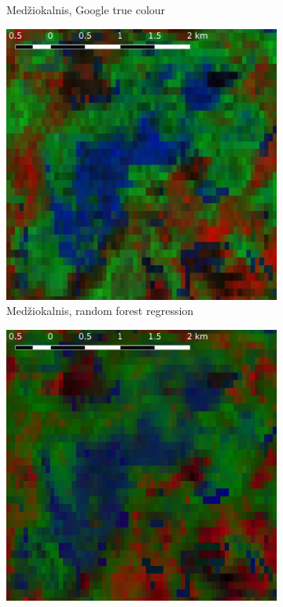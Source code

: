 \documentclass[a4paper,12pt]{scrbook}
\begin{document}
\begin{figure}
\begin{subfigure}[t]{.24\textwidth}
    \caption{Med\v{z}iokalnis, Google true colour}
  \end{subfigure} \hfill
  \begin{subfigure}[t]{.24\textwidth}
    \includegraphics[width=\textwidth]{thesis-figures/figures-qgis/medziokalnis-rf}
    \caption{Med\v{z}iokalnis, random forest regression}
    \label{subfig-medziokalnis-rf}
  \end{subfigure} \hfill
  \begin{subfigure}[t]{.24\textwidth}
    \includegraphics[width=\textwidth]{thesis-figures/figures-qgis/medziokalnis-nn}

\end{subfigure}
\end{figure}
\end{document}
